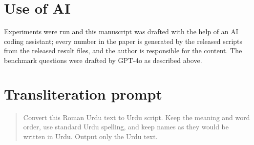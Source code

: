 \documentclass[11pt]{article}
\begin{document}
\section*{Use of AI}
Experiments were run and this manuscript was drafted with the help of an AI coding assistant; every number in the paper is generated by the released scripts from the released result files, and the author is responsible for the content. The benchmark questions were drafted by GPT-4o as described above.



\appendix
\section{Transliteration prompt}
\label{app:prompt}
\begin{quote}\small
Convert this Roman Urdu text to Urdu script. Keep the meaning and word order, use standard Urdu spelling, and keep names as they would be written in Urdu. Output only the Urdu text.
\end{quote}


\end{document}
